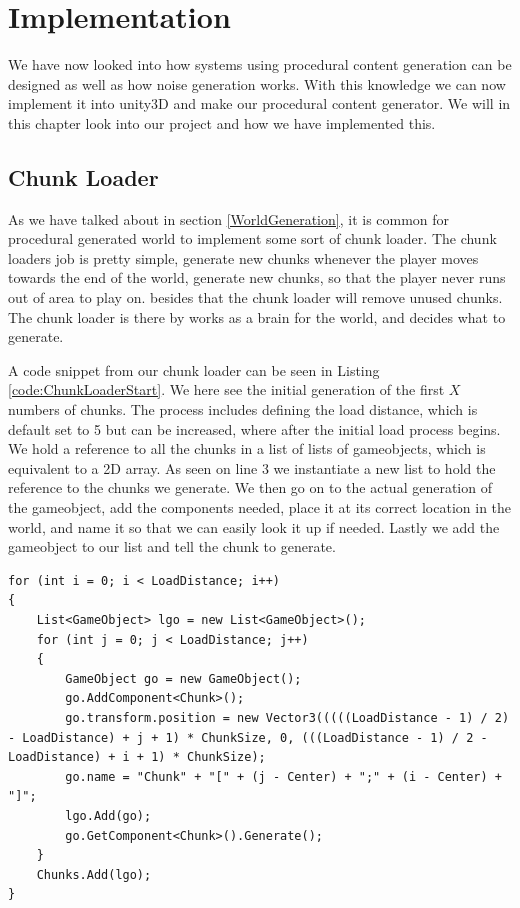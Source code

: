 \chapter{Implementation}

We have now looked into how systems using procedural content generation can be designed as well as how noise generation works. With this knowledge we can now implement it into unity3D and make our procedural content generator. We will in this chapter look into our project and how we have implemented this. %


\section{Chunk Loader}

As we have talked about in section \ref{WorldGeneration}, it is common for procedural generated world to implement some sort of chunk loader. The chunk loaders job is pretty simple, generate new chunks whenever the player moves towards the end of the world, generate new chunks, so that the player never runs out of area to play on. besides that the chunk loader will remove unused chunks. The chunk loader is there by works as a brain for the world, and decides what to generate.

A code snippet from our chunk loader can be seen in Listing \ref{code:ChunkLoaderStart}. We here see the initial generation of the first $X$ numbers of chunks. The process includes defining the load distance, which is default set to 5 but can be increased, where after the initial load process begins. We hold a reference to all the chunks in a list of lists of gameobjects, which is equivalent to a 2D array. As seen on line 3 we instantiate a new list to hold the reference to the chunks we generate. We then go on to the actual generation of the gameobject, add the components needed, place it at its correct location in the world, and name it so that we can easily look it up if needed. Lastly we add the gameobject to our list and tell the chunk to generate.

\begin{lstlisting}[caption = Code snippet from the start method in the ChunkLoader script., label=code:ChunkLoaderStart, language=Csharp]
for (int i = 0; i < LoadDistance; i++)
{
	List<GameObject> lgo = new List<GameObject>();
	for (int j = 0; j < LoadDistance; j++)
	{
		GameObject go = new GameObject();
		go.AddComponent<Chunk>();
		go.transform.position = new Vector3(((((LoadDistance - 1) / 2) - LoadDistance) + j + 1) * ChunkSize, 0, (((LoadDistance - 1) / 2 - LoadDistance) + i + 1) * ChunkSize);
		go.name = "Chunk" + "[" + (j - Center) + ";" + (i - Center) + "]";
		lgo.Add(go);
		go.GetComponent<Chunk>().Generate();
	}
	Chunks.Add(lgo);
}
\end{lstlisting}

